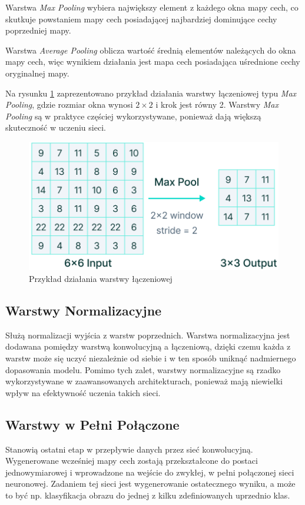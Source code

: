 Warstwa \textit{Max Pooling} wybiera największy element z każdego okna mapy cech, co skutkuje powstaniem mapy cech posiadającej najbardziej dominujące cechy poprzedniej mapy.

Warstwa \textit{Average Pooling} oblicza wartość średnią elementów należących do okna mapy cech, więc wynikiem działania jest mapa cech posiadająca uśrednione cechy oryginalnej mapy.

Na rysunku \ref{MaxPooling} zaprezentowano przykład działania warstwy łączeniowej typu \textit{Max Pooling}, gdzie rozmiar okna wynosi $2 \times 2$ i krok jest równy 2. Warstwy \textit{Max Pooling} są w praktyce częściej wykorzystywane, ponieważ dają większą skuteczność w uczeniu sieci.

\newpage
\begin{figure}[h]
\begin{center}
\includegraphics[width=15cm]{resources/figures/max-pool.png}
\caption{Przykład działania warstwy łączeniowej}
\label{MaxPooling}
\end{center}
\end{figure}

\vspace{-0.5cm}
\subsection{Warstwy Normalizacyjne}
Służą normalizacji wyjścia z warstw poprzednich. Warstwa normalizacyjna jest dodawana pomiędzy warstwą konwolucyjną a łączeniową, dzięki czemu każda z warstw może się uczyć niezależnie od siebie i w ten sposób uniknąć nadmiernego dopasowania modelu. Pomimo tych zalet, warstwy normalizacyjne są rzadko wykorzystywane w zaawansowanych architekturach, ponieważ mają niewielki wpływ na efektywność uczenia takich sieci.

\subsection{Warstwy w Pełni Połączone}
Stanowią ostatni etap w przepływie danych przez sieć konwolucyjną. Wygenerowane wcześniej mapy cech zostają przekształcone do postaci jednowymiarowej i wprowadzone na wejście do zwykłej, w pełni połączonej sieci neuronowej. Zadaniem tej sieci jest wygenerowanie ostatecznego wyniku, a może to być np. klasyfikacja obrazu do jednej z kilku zdefiniowanych uprzednio klas.

